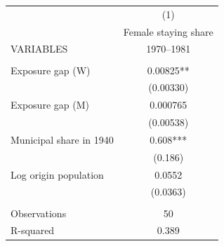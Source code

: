 \begin{tabular}{lc} \hline
 & (1) \\
 & Female staying share \\
VARIABLES & 1970--1981 \\ \hline
 &  \\
Exposure gap (W) & 0.00825** \\
 & (0.00330) \\
Exposure gap (M) & 0.000765 \\
 & (0.00538) \\
Municipal share in 1940 & 0.608*** \\
 & (0.186) \\
Log origin population & 0.0552 \\
 & (0.0363) \\
 &  \\
Observations & 50 \\
 R-squared & 0.389 \\ \hline
\end{tabular}
